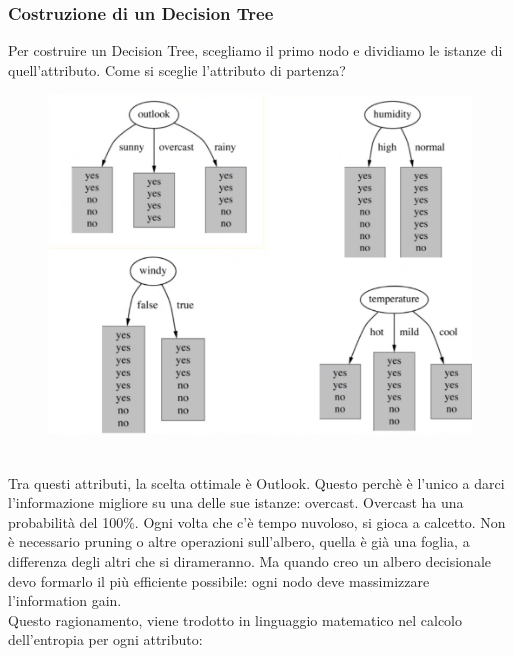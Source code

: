 \subsubsection{Costruzione di un Decision Tree}
Per costruire un Decision Tree, scegliamo il primo nodo e dividiamo le istanze di quell'attributo. Come si sceglie l'attributo di partenza?
\\
\begin{figure}[th]
    \centering
    \includegraphics[scale=0.5]{ML/img/dt_scelta.png}
\end{figure}
\\
Tra questi attributi, la scelta ottimale è Outlook. Questo perchè è l'unico a darci l'informazione migliore su una delle sue istanze: overcast. Overcast ha una probabilità del 100\%. Ogni volta che c'è tempo nuvoloso, si gioca a calcetto. Non è necessario pruning o altre operazioni sull'albero, quella è già una foglia, a differenza degli altri che si dirameranno. Ma quando creo un albero decisionale devo formarlo il più efficiente possibile: ogni nodo deve massimizzare l'information gain. 
\\
Questo ragionamento, viene trodotto in linguaggio matematico nel calcolo dell'entropia per ogni attributo:
